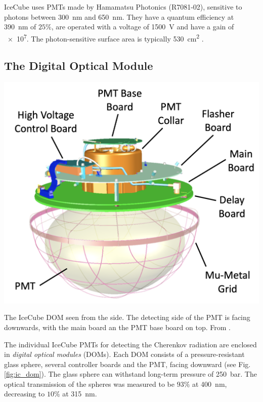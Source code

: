 \documentclass[
    a4paper, %
    fontsize=10pt, %
    twoside=true, %
    numbers=noenddot, %
    fontmethod=tex, %
]{kaobook}
\begin{document}
IceCube uses PMTs made by Hamamatsu Photonics (R7081-02), sensitive to photons between \SI{300}{\nm} and \SI{650}{\nm}. They have a quantum efficiency at \SI{390}{\nm} of $25\%$, are operated with a voltage of \SI{1500}{\V} and have a gain of \num{e7}. The photon-sensitive surface area is typically \SI{530}{\cm\squared} .

\subsection*{The Digital Optical Module} \label{DOM}
\begin{marginfigure}
    \includegraphics{ic_DOM.png}
    \caption[IceCube digital optical module]{The IceCube DOM seen from the side. The detecting side of the PMT is facing downwards, with the main board an the PMT base board on top. From \cite{Aartsen2017}.}
\end{marginfigure}
The individual IceCube PMTs for detecting the Cherenkov radiation are enclosed in \textit{digital optical modules} (DOMs). Each DOM consists of a pressure-resistant glass sphere, several controller boards and the PMT, facing downward (see Fig. \ref{fig:ic_dom}). The glass sphere can withstand long-term pressure of \SI{250}{\bar}. The optical transmission of the spheres was measured to be $93\%$ at \SI{400}{\nm}, decreasing to $10\%$ at \SI{315}{\nm}.
\end{document}
